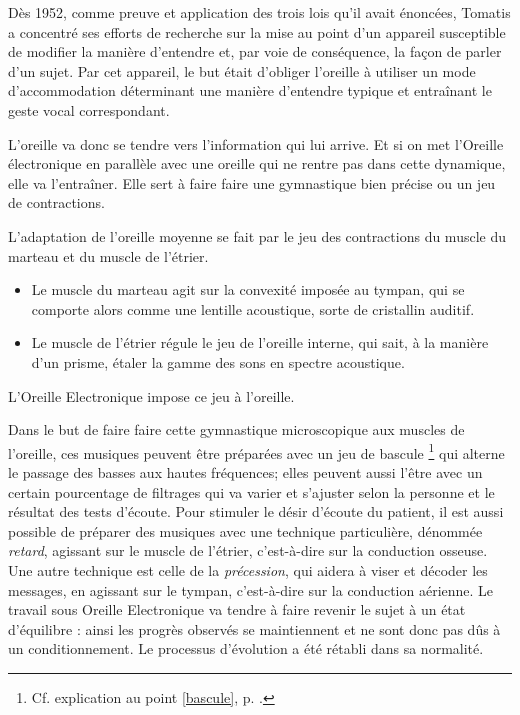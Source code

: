 Dès 1952, comme preuve et application des trois lois qu'il avait énoncées,
Tomatis a concentré ses efforts de recherche sur la mise au point
d'un appareil susceptible de modifier la manière d'entendre et, par
voie de conséquence, la façon de parler d'un sujet. Par cet appareil,
le but était d'obliger l'oreille à utiliser un mode d'accommodation
déterminant une manière d'entendre typique et entraînant le geste
vocal correspondant.

L'oreille va donc se tendre
vers l'information qui lui arrive.  Et si on met l'Oreille électronique en parallèle avec une
oreille qui ne rentre pas dans cette dynamique, elle va l'entraîner.
Elle sert à faire faire une gymnastique bien précise ou un jeu de
contractions.

L'adaptation de l'oreille moyenne se fait par le jeu des contractions
du muscle du marteau et du muscle de l'étrier.
\begin{itemize}
\item Le muscle du marteau agit sur la convexité imposée au tympan, qui
se comporte alors comme une lentille acoustique, sorte de cristallin
auditif.
\item Le muscle de l'étrier régule le jeu de l'oreille interne, qui sait,
à la manière d'un prisme, étaler la gamme des sons en spectre acoustique.
\end{itemize}

L'Oreille Electronique impose ce jeu à l'oreille.


Dans le but de faire faire cette gymnastique microscopique aux muscles
de l'oreille, ces musiques peuvent être préparées avec un jeu de bascule%
\footnote{Cf. explication au point \ref{bascule}, p. \pageref{bascule}.} 
qui alterne le passage des basses aux hautes
fréquences; elles peuvent aussi l'être avec un certain pourcentage
de filtrages qui va varier et s'ajuster selon la personne
et le résultat des tests d'écoute. Pour stimuler le désir d'écoute
du patient, il est aussi possible de préparer des musiques avec une
technique particulière, dénommée \emph{retard}, agissant sur le muscle de
l'étrier, c'est-à-dire sur la conduction osseuse. Une autre technique
est celle de la \emph{précession}, qui aidera à viser et décoder les messages,
en agissant sur le tympan, c'est-à-dire sur la conduction aérienne. 
Le travail sous Oreille Electronique va tendre
à faire revenir le sujet à un état d'équilibre : ainsi les progrès
observés se maintiennent et ne sont donc pas dûs à un conditionnement.
Le processus d'évolution a été rétabli dans sa normalité.

